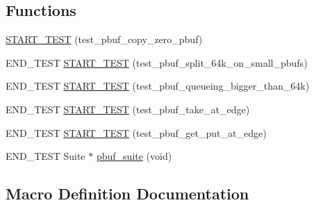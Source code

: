 \subsection*{Functions}
\begin{DoxyCompactItemize}
\item 
\hyperlink{openmote-cc2538_2lwip_2test_2unit_2core_2test__pbuf_8c_a3176e3e538ea354100abdb86e48e9eb3}{S\+T\+A\+R\+T\+\_\+\+T\+E\+ST} (test\+\_\+pbuf\+\_\+copy\+\_\+zero\+\_\+pbuf)
\item 
E\+N\+D\+\_\+\+T\+E\+ST \hyperlink{openmote-cc2538_2lwip_2test_2unit_2core_2test__pbuf_8c_ac49c6e9cbd62432654f23b2b6387f61e}{S\+T\+A\+R\+T\+\_\+\+T\+E\+ST} (test\+\_\+pbuf\+\_\+split\+\_\+64k\+\_\+on\+\_\+small\+\_\+pbufs)
\item 
E\+N\+D\+\_\+\+T\+E\+ST \hyperlink{openmote-cc2538_2lwip_2test_2unit_2core_2test__pbuf_8c_ae064d8320f9e9590e654a7ef21da6ea0}{S\+T\+A\+R\+T\+\_\+\+T\+E\+ST} (test\+\_\+pbuf\+\_\+queueing\+\_\+bigger\+\_\+than\+\_\+64k)
\item 
E\+N\+D\+\_\+\+T\+E\+ST \hyperlink{openmote-cc2538_2lwip_2test_2unit_2core_2test__pbuf_8c_afd94a14446b27ce90d57c5a0e324807e}{S\+T\+A\+R\+T\+\_\+\+T\+E\+ST} (test\+\_\+pbuf\+\_\+take\+\_\+at\+\_\+edge)
\item 
E\+N\+D\+\_\+\+T\+E\+ST \hyperlink{openmote-cc2538_2lwip_2test_2unit_2core_2test__pbuf_8c_acf20a4908a45f378233f25a41bccbb79}{S\+T\+A\+R\+T\+\_\+\+T\+E\+ST} (test\+\_\+pbuf\+\_\+get\+\_\+put\+\_\+at\+\_\+edge)
\item 
E\+N\+D\+\_\+\+T\+E\+ST Suite $\ast$ \hyperlink{openmote-cc2538_2lwip_2test_2unit_2core_2test__pbuf_8c_a185b3b75c580fd71edb8a2348e2b256a}{pbuf\+\_\+suite} (void)
\end{DoxyCompactItemize}


\subsection{Macro Definition Documentation}
\mbox{\label{openmote-cc2538_2lwip_2test_2unit_2core_2test__pbuf_8c_aa8f228f4f82da39f9ff2b25f904ec26f}} 
